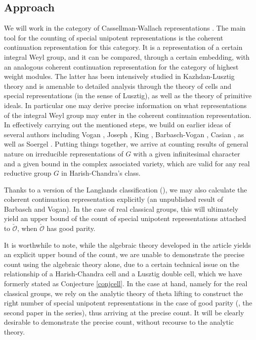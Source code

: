 \documentclass[12pt,a4paper]{amsart}
\newcommand{\CO}{{\mathcal {O}}}
\numberwithin{equation}{section}
\theoremstyle{remark}
\begin{document}
\subsection{Approach}
We will work in the category of Cassellman-Wallach representations \cite[Chapter 11]{Wa2}. The main tool for the counting of special unipotent representations is the coherent continuation representation for this category. It is a representation of a certain integral Weyl group, and it can be compared, through a certain embedding, with an analogous coherent continuation representation for the category of highest weight modules. The latter has been intensively studied in Kazhdan-Lusztig theory and is amenable to detailed analysis through the theory of cells and special representations (in the sense of Lusztig), as well as the theory of primitive ideals. In particular one may derive precise information on what representations of the integral Weyl group may enter in the coherent continuation representation. In effectively carrying out the mentioned steps, we build on earlier ideas of several authors including Vogan \cite{Vg}, Joseph \cite{J1,J2},  King \cite{King}, Barbasch-Vogan \cite{BVUni}, Casian \cite{Cas}, as well as Soergel \cite{Soergel}. Putting things together, we arrive at counting results of general nature on irreducible representations of $G$ with a given infinitesimal character and a given bound in the complex associated variety, which are valid for any real reductive group $G$ in Harish-Chandra's class.

Thanks to a version of the Langlands classification (\cite{Vg}), we may also calculate the coherent continuation representation explicitly (an unpublished result of Barbasch and Vogan). In the case of real classical groups, this will ultimately yield an upper bound of the count of special unipotent representations attached to $\check \CO$, when $\check \CO$ has good parity.

It is worthwhile to note, while the algebraic theory developed in the article yields an explicit upper bound of the count, we are unable to demonstrate the precise count using the algebraic theory alone, due to a certain technical issue on the relationship of a Harish-Chandra cell and a Lusztig double cell, which we have formerly stated as Conjecture \ref{conjcell}. In the case at hand, namely for the real classical groups, we rely on the analytic theory of theta lifting to construct the right number of special unipotent representations in the case of good parity (\cite{BMSZ2}, the second paper in the series), thus arriving at the precise count. It will be clearly desirable to demonstrate the precise count, without recourse to the analytic theory.
\end{document}
